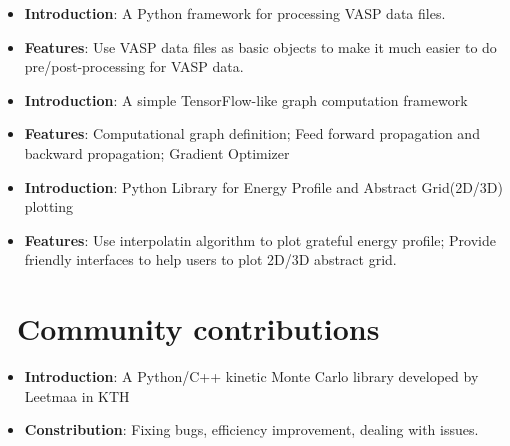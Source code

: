\documentclass{resume}
\begin{document}
\begin{onehalfspacing}
\begin{itemize}
    \item \textbf{Introduction}: A Python framework for processing VASP data files.
    \item \textbf{Features}: Use VASP data files as basic objects to make it much easier to do pre/post-processing for VASP data.
\end{itemize}
\end{onehalfspacing}

\begin{onehalfspacing}
\begin{itemize}
    \item \textbf{Introduction}: A simple TensorFlow-like graph computation framework 
    \item \textbf{Features}: Computational graph definition; Feed forward propagation and backward propagation; Gradient Optimizer
\end{itemize}
\end{onehalfspacing}

\begin{onehalfspacing}
\begin{itemize}
    \item \textbf{Introduction}: Python Library for Energy Profile and Abstract Grid(2D/3D) plotting
    \item \textbf{Features}: Use interpolatin algorithm to plot grateful energy profile; Provide friendly interfaces to help users to plot 2D/3D abstract grid.
\end{itemize}
\end{onehalfspacing}

\section{\faCodeFork\ Community contributions}

\begin{onehalfspacing}
\begin{itemize}
    \item \textbf{Introduction}: A Python/C++ kinetic Monte Carlo library developed by Leetmaa in KTH
    \item \textbf{Constribution}: Fixing bugs, efficiency improvement, dealing with issues.
\end{itemize}
\end{onehalfspacing}
\end{document}
